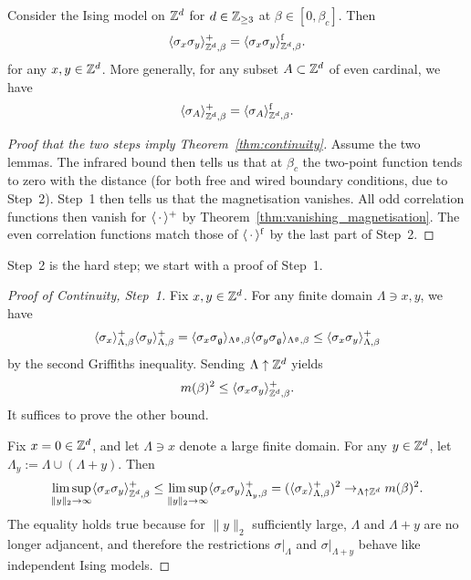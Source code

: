 \begin{lemma}
    Consider the Ising model on $\mathbb Z^d$ for $d\in\mathbb Z_{\geq 3}$ at $\beta\in[0,\beta_c]$.
    Then
    \[
        \langle\sigma_x\sigma_y\rangle_{\mathbb Z^d,\beta}^+
        =
        \langle\sigma_x\sigma_y\rangle_{\mathbb Z^d,\beta}^{\operatorname{f}}.
    \]
    for any $x,y\in\mathbb Z^d$.
    More generally, for any subset $A\subset\mathbb Z^d$ of even cardinal, we have 
    \[
        \langle\sigma_A\rangle_{\mathbb Z^d,\beta}^+
        =
        \langle\sigma_A\rangle_{\mathbb Z^d,\beta}^{\operatorname{f}}.
    \]
\end{lemma}

\begin{proof}[Proof that the two steps imply Theorem~\ref{thm:continuity}]
    Assume the two lemmas.
    The infrared bound then tells us that at $\beta_c$ the two-point function tends
    to zero with the distance (for both free and wired boundary conditions, due to Step~2).
    Step~1 then tells us that the magnetisation vanishes.
    All odd correlation functions then vanish for $\langle\,\cdot\,\rangle^+$ by Theorem~\ref{thm:vanishing_magnetisation}.
    The even correlation functions match those of $\langle\,\cdot\,\rangle^{\operatorname{f}}$ by the last part of Step~2.
\end{proof}

Step~2 is the hard step; we start with a proof of Step~1.

\begin{proof}[Proof of Continuity, Step~1]
    Fix $x,y\in\mathbb Z^d$.
    For any finite domain $\Lambda\ni x,y$,
    we have
    \[
        \langle\sigma_x\rangle_{\Lambda,\beta}^+
        \langle\sigma_y\rangle_{\Lambda,\beta}^+
        =
        \langle\sigma_x\sigma_\mathfrak g\rangle_{\Lambda^\mathfrak g,\beta}
        \langle\sigma_y\sigma_\mathfrak g\rangle_{\Lambda^\mathfrak g,\beta}
        \leq
        \langle\sigma_x\sigma_y\rangle_{\Lambda,\beta}^+
    \]
    by the second Griffiths inequality.
    Sending $\Lambda\uparrow\mathbb Z^d$ yields
    \[
        m(\beta)^2\leq \langle\sigma_x\sigma_y\rangle_{\mathbb Z^d,\beta}^+.
    \]
    It suffices to prove the other bound.

    Fix $x=0\in\mathbb Z^d$, and let $\Lambda\ni x$ denote a large finite domain.
    For any $y\in\mathbb Z^d$, let $\Lambda_y:=\Lambda\cup(\Lambda+y)$.
    Then
    \[
        \limsup_{\|y\|_2\to\infty}\langle\sigma_x\sigma_y\rangle_{\mathbb Z^d,\beta}^+
        \leq
        \limsup_{\|y\|_2\to\infty}\langle\sigma_x\sigma_y\rangle_{\Lambda_y,\beta}^+
        =
        (\langle\sigma_x\rangle_{\Lambda,\beta}^+)^2
        \to_{\Lambda\uparrow\mathbb Z^d}m(\beta)^2.
    \]
    The equality holds true because for $\|y\|_2$ sufficiently large,
    $\Lambda$ and $\Lambda+y$ are no longer adjancent,
    and therefore the restrictions $\sigma|_\Lambda$
    and $\sigma|_{\Lambda+y}$ behave like independent Ising models.
\end{proof}


